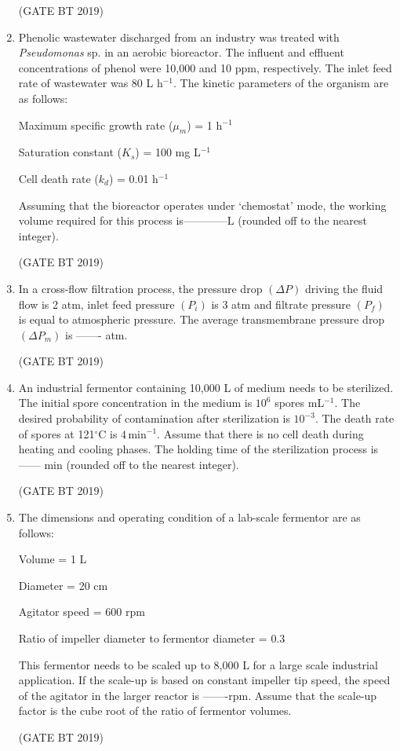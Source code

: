 \documentclass[journal,12pt,onecolumn]{IEEEtran}
\begin{document}
\begin{enumerate}
\hfill(GATE BT 2019)


\item Phenolic wastewater discharged from an industry was treated with \textit{Pseudomonas} sp. in an aerobic bioreactor. The influent and effluent concentrations of phenol were 10{,}000 and 10 ppm, respectively. The inlet feed rate of wastewater was 80 L h$^{-1}$. The kinetic parameters of the organism are as follows:  

Maximum specific growth rate ($\mu_{m}$) = 1 h$^{-1}$  

Saturation constant ($K_{s}$) = 100 mg L$^{-1}$  

Cell death rate ($k_{d}$) = 0.01 h$^{-1}$  

Assuming that the bioreactor operates under ‘chemostat’ mode, the working volume required for this process is------------L (rounded off to the nearest integer).

\hfill(GATE BT 2019)


\item In a cross-flow filtration process, the pressure drop $(\Delta P)$ driving the fluid flow is 2 atm, inlet feed pressure $(P_{i})$ is 3 atm and filtrate pressure $(P_{f})$ is equal to atmospheric pressure. The average transmembrane pressure drop $(\Delta P_{m})$ is ------- atm.

\hfill(GATE BT 2019)


\item An industrial fermentor containing 10{,}000 L of medium needs to be sterilized. The initial spore concentration in the medium is $10^{6}$ spores mL$^{-1}$. The desired probability of contamination after sterilization is $10^{-3}$. The death rate of spores at 121$^{\circ}$C is $4 \, \text{min}^{-1}$. Assume that there is no cell death during heating and cooling phases. The holding time of the sterilization process is ------ min (rounded off to the nearest integer).

\hfill(GATE BT 2019)


\item The dimensions and operating condition of a lab-scale fermentor are as follows:  

Volume = 1 L 

Diameter = 20 cm 

Agitator speed = 600 rpm 

Ratio of impeller diameter to fermentor diameter = 0.3  

This fermentor needs to be scaled up to 8,000 L for a large scale industrial application. If the scale-up is based on constant impeller tip speed, the speed of the agitator in the larger reactor is -------rpm. Assume that the scale-up factor is the cube root of the ratio of fermentor volumes.

\hfill(GATE BT 2019)



  
     
\end{enumerate}
\end{document}

